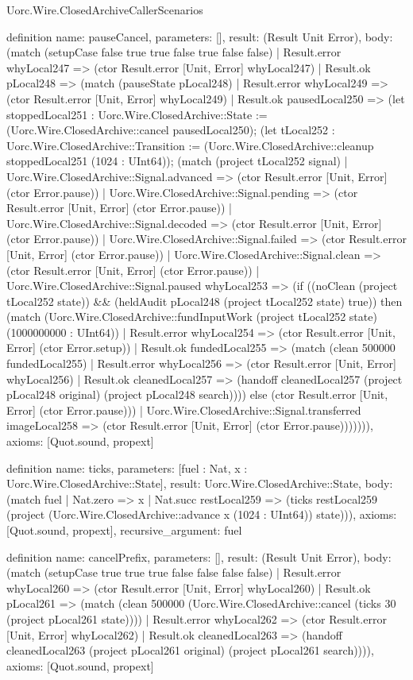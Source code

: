 \begin{lexlean}{Uorc.Wire.ClosedArchiveCallerScenarios}
\begin{semanticmodule}
definition{
  name: pauseCancel,
  parameters: [],
  result: (Result Unit Error),
  body: (match (setupCase false true true false true false false)
    | Result.error whyLocal247 => (ctor Result.error [Unit, Error] whyLocal247)
    | Result.ok pLocal248 => (match (pauseState pLocal248)
      | Result.error whyLocal249 => (ctor Result.error [Unit, Error] whyLocal249)
      | Result.ok pausedLocal250 => (let stoppedLocal251 : Uorc.Wire.ClosedArchive::State := (Uorc.Wire.ClosedArchive::cancel pausedLocal250); (let tLocal252 : Uorc.Wire.ClosedArchive::Transition := (Uorc.Wire.ClosedArchive::cleanup stoppedLocal251 (1024 : UInt64)); (match (project tLocal252 signal)
        | Uorc.Wire.ClosedArchive::Signal.advanced => (ctor Result.error [Unit, Error] (ctor Error.pause))
        | Uorc.Wire.ClosedArchive::Signal.pending => (ctor Result.error [Unit, Error] (ctor Error.pause))
        | Uorc.Wire.ClosedArchive::Signal.decoded => (ctor Result.error [Unit, Error] (ctor Error.pause))
        | Uorc.Wire.ClosedArchive::Signal.failed => (ctor Result.error [Unit, Error] (ctor Error.pause))
        | Uorc.Wire.ClosedArchive::Signal.clean => (ctor Result.error [Unit, Error] (ctor Error.pause))
        | Uorc.Wire.ClosedArchive::Signal.paused whyLocal253 => (if ((noClean (project tLocal252 state)) && (heldAudit pLocal248 (project tLocal252 state) true)) then (match (Uorc.Wire.ClosedArchive::fundInputWork (project tLocal252 state) (1000000000 : UInt64))
          | Result.error whyLocal254 => (ctor Result.error [Unit, Error] (ctor Error.setup))
          | Result.ok fundedLocal255 => (match (clean 500000 fundedLocal255)
            | Result.error whyLocal256 => (ctor Result.error [Unit, Error] whyLocal256)
            | Result.ok cleanedLocal257 => (handoff cleanedLocal257 (project pLocal248 original) (project pLocal248 search)))) else (ctor Result.error [Unit, Error] (ctor Error.pause)))
        | Uorc.Wire.ClosedArchive::Signal.transferred imageLocal258 => (ctor Result.error [Unit, Error] (ctor Error.pause))))))),
  axioms: [Quot.sound, propext]
}

definition{
  name: ticks,
  parameters: [fuel : Nat, x : Uorc.Wire.ClosedArchive::State],
  result: Uorc.Wire.ClosedArchive::State,
  body: (match fuel
    | Nat.zero => x
    | Nat.succ restLocal259 => (ticks restLocal259 (project (Uorc.Wire.ClosedArchive::advance x (1024 : UInt64)) state))),
  axioms: [Quot.sound, propext],
  recursive_argument: fuel
}

definition{
  name: cancelPrefix,
  parameters: [],
  result: (Result Unit Error),
  body: (match (setupCase true true true false false false false)
    | Result.error whyLocal260 => (ctor Result.error [Unit, Error] whyLocal260)
    | Result.ok pLocal261 => (match (clean 500000 (Uorc.Wire.ClosedArchive::cancel (ticks 30 (project pLocal261 state))))
      | Result.error whyLocal262 => (ctor Result.error [Unit, Error] whyLocal262)
      | Result.ok cleanedLocal263 => (handoff cleanedLocal263 (project pLocal261 original) (project pLocal261 search)))),
  axioms: [Quot.sound, propext]
}


\end{semanticmodule}
\end{lexlean}
